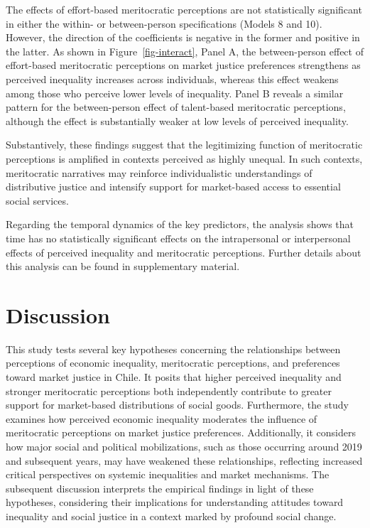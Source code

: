 \documentclass[
  12pt,
]{article}
\begin{document}
The effects of effort-based meritocratic perceptions are not
statistically significant in either the within- or between-person
specifications (Models 8 and 10). However, the direction of the
coefficients is negative in the former and positive in the latter. As
shown in Figure~\ref{fig-interact}, Panel A, the between-person effect
of effort-based meritocratic perceptions on market justice preferences
strengthens as perceived inequality increases across individuals,
whereas this effect weakens among those who perceive lower levels of
inequality. Panel B reveals a similar pattern for the between-person
effect of talent-based meritocratic perceptions, although the effect is
substantially weaker at low levels of perceived inequality.

Substantively, these findings suggest that the legitimizing function of
meritocratic perceptions is amplified in contexts perceived as highly
unequal. In such contexts, meritocratic narratives may reinforce
individualistic understandings of distributive justice and intensify
support for market-based access to essential social services.

Regarding the temporal dynamics of the key predictors, the analysis
shows that time has no statistically significant effects on the
intrapersonal or interpersonal effects of perceived inequality and
meritocratic perceptions. Further details about this analysis can be
found in supplementary material.

\section{Discussion}\label{discussion}

This study tests several key hypotheses concerning the relationships
between perceptions of economic inequality, meritocratic perceptions,
and preferences toward market justice in Chile. It posits that higher
perceived inequality and stronger meritocratic perceptions both
independently contribute to greater support for market-based
distributions of social goods. Furthermore, the study examines how
perceived economic inequality moderates the influence of meritocratic
perceptions on market justice preferences. Additionally, it considers
how major social and political mobilizations, such as those occurring
around 2019 and subsequent years, may have weakened these relationships,
reflecting increased critical perspectives on systemic inequalities and
market mechanisms. The subsequent discussion interprets the empirical
findings in light of these hypotheses, considering their implications
for understanding attitudes toward inequality and social justice in a
context marked by profound social change.
\end{document}
